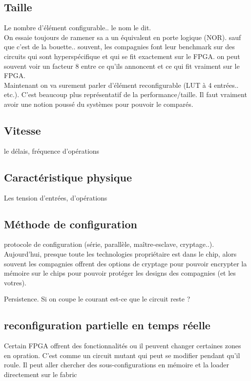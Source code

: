 \documentclass[oneside]{book}
\begin{document}
        \subsection{Taille}
        Le nombre d'élément configurable.. le nom le dit.\\
        
        On essaie toujours de ramener sa a un équivalent en porte logique (NOR). sauf que c'est de la bouette.. souvent, les compagnies font leur benchmark sur des circuits qui sont hyperspécifique et qui se fit exactement sur le FPGA. on peut souvent voir un facteur 8 entre ce qu'ils annoncent et ce qui fit vraiment sur le FPGA.\\
        
        Maintenant on va surement parler d'élément reconfigurable (LUT à 4 entrées.. etc.). C'est beaucoup plus représentatif de la performance/taille. Il faut vraiment avoir une notion poussé du systèmes pour pouvoir le comparés.
        \subsection{Vitesse}
        le délais, fréquence d'opérations
        \subsection{Caractéristique physique}
        Les tension d'entrées, d'opérations
        \subsection{Méthode de configuration}
        protocole de configuration (série, parallèle, maître-esclave, cryptage..).\\
        
        Aujourd'hui, presque toute les technologies propriétaire est dans le chip, alors souvent les compagnies offrent des options de cryptage pour pouvoir encrypter la mémoire sur le chips pour pouvoir protéger les designs des compagnies (et les votres).
        
        Persistence. Si on coupe le courant est-ce que le circuit reste ?
        \subsection{reconfiguration partielle en temps réelle}
        Certain FPGA offrent des fonctionnalités ou il peuvent changer certaines zones en opration. C'est comme un circuit mutant qui peut se modifier pendant qu'il roule. Il peut aller chercher des sous-configurations en mémoire et la loader directement sur le fabric\\
\end{document}
